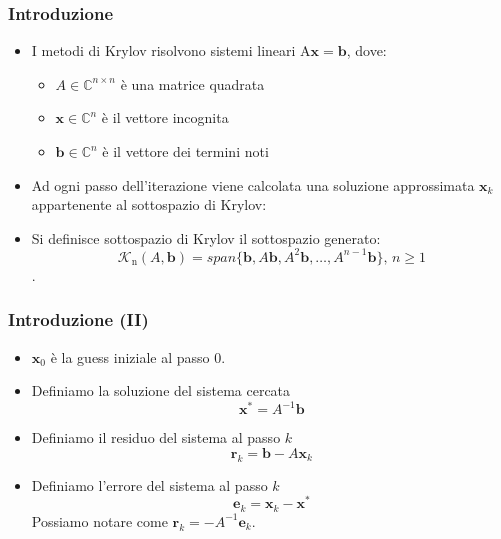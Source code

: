 \documentclass[10pt]{beamer}
\begin{document}
\begin{frame} \frametitle{Introduzione}
\begin{itemize}
    \item I metodi di Krylov risolvono sistemi lineari A$\mathbf{x}=\mathbf{b}$, dove:
    \begin{itemize}
    \item $A\in\mathbb{C}^{n\times n}$ è una matrice quadrata
    \item $\mathbf{x}\in\mathbb{C}^{n}$ è il vettore incognita
    \item $\mathbf{b}\in\mathbb{C}^{n}$ è il vettore dei termini noti
    \end{itemize}
    \item Ad ogni passo dell'iterazione viene calcolata una soluzione approssimata $\mathbf{x}_k$ appartenente al sottospazio di Krylov:
    \item Si definisce \alert{sottospazio di Krylov} il sottospazio generato:
    $$
    \mathcal{K}_\mathrm{n}(A,\mathbf{b})=span\{\mathbf{b},A\mathbf{b},A^2\mathbf{b},\dots,A^{n-1}\mathbf{b}\}\text{, } n\geq1
    $$.
    
\end{itemize}
\end{frame} 

\begin{frame} \frametitle{Introduzione (II)}
\begin{itemize}
    \item $\mathbf{x}_0$ è la \alert{guess} iniziale al passo $0$.
    \item Definiamo la \alert{soluzione} del sistema cercata $$\mathbf{x}^*=A^{-1}\mathbf{b}$$
    \item Definiamo il \alert{residuo} del sistema al passo $k$
    $$\mathbf{r}_k =\mathbf{b}-A\mathbf{x}_k$$
    \item Definiamo l'\alert{errore} del sistema al passo $k$
    $$\mathbf{e}_k =\mathbf{x}_k-\mathbf{x}^*$$
    Possiamo notare come $\mathbf{r}_k=-A^{-1}\mathbf{e}_k$.
\end{itemize}
\end{frame} 
\end{document}
